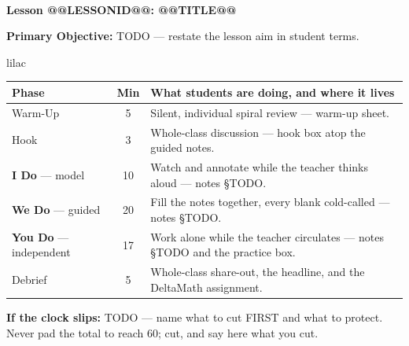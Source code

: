 \documentclass[10pt]{article}
\makeatletter
\newcommand{\LessonNumberName}{Lesson @@LESSONID@@: @@TITLE@@}
\makeatother
\begin{document}
\begin{center}
    {\Large\bfseries \CourseName \\
    {\small\bfseries \UnitNumberName \LessonNumberName}}
\end{center}

\begin{tcolorbox}[colback=lilac, colframe=plum, boxrule=0.9pt, arc=2mm,
    left=2mm, right=2mm, top=1.5mm, bottom=1.5mm]
    \textbf{Primary Objective:} TODO --- restate the lesson aim in student terms.
\end{tcolorbox}

\boxguard[22]
\begin{skillbox}{lilac}
\small
\renewcommand{\arraystretch}{1.25}
\begin{tabularx}{\linewidth}{@{} l c X @{}}
\textbf{Phase} & \textbf{Min} & \textbf{What students are doing, and where it lives} \\
\midrule
Warm-Up                       & 5  & Silent, individual spiral review --- warm-up sheet. \\
Hook                          & 3  & Whole-class discussion --- hook box atop the guided notes. \\
\textbf{I Do} --- model       & 10 & Watch and annotate while the teacher thinks aloud --- notes \S TODO. \\
\textbf{We Do} --- guided     & 20 & Fill the notes together, every blank cold-called --- notes \S TODO. \\
\textbf{You Do} --- independent & 17 & Work alone while the teacher circulates --- notes \S TODO and the practice box. \\
Debrief                       & 5  & Whole-class share-out, the headline, and the DeltaMath assignment. \\
\end{tabularx}

\smallskip
\textbf{If the clock slips:} TODO --- name what to cut FIRST and what to protect.
Never pad the total to reach 60; cut, and say here what you cut.
\end{skillbox}
\end{document}
